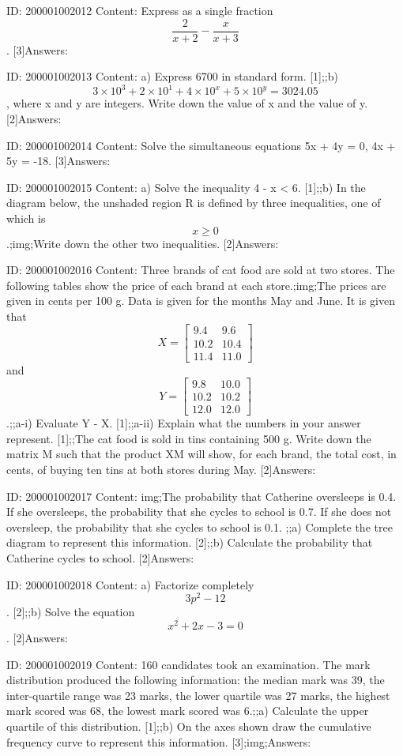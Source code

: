 \documentclass{article}
\begin{document}
ID: 200001002012
Content:
Express as a single fraction $$\frac{2}{x+2}-\frac{x}{x+3}$$. [3]Answers:

ID: 200001002013
Content:
a) Express 6700 in standard form. [1];;b) $$3 \times 10^{3} +2 \times 10^{1} +4 \times 10^{x}+5 \times 10^{y}=3024.05$$, where x and y are integers. Write down the value of x and the value of y. [2]Answers:

ID: 200001002014
Content:
Solve the simultaneous equations 5x + 4y = 0, 4x + 5y = -18. [3]Answers:

ID: 200001002015
Content:
a) Solve the inequality 4 - x < 6. [1];;b) In the diagram below, the unshaded region R is defined by three inequalities, one of which is $$x \geq 0$$.;img;Write down the other two inequalities. [2]Answers:

ID: 200001002016
Content:
Three brands of cat food are sold at two stores. The following tables show the price of each brand at each store.;img;The prices are given in cents per 100 g. Data is given for the months May and June. It is given that $$X=\begin{bmatrix}9.4&9.6\\10.2&10.4\\11.4&11.0\end{bmatrix}$$ and $$Y=\begin{bmatrix}9.8&10.0\\10.2&10.2\\12.0&12.0\end{bmatrix}$$.;;a-i) Evaluate Y - X. [1];;a-ii) Explain what the numbers in your answer represent. [1];;The cat food is sold in tins containing 500 g. Write down the matrix M such that the product XM will show, for each brand, the total cost, in cents, of buying ten tins at both stores during May. [2]Answers:

ID: 200001002017
Content:
img;The probability that Catherine oversleeps is 0.4. If she oversleeps, the probability that she cycles to school is 0.7. If she does not oversleep, the probability that she cycles to school is 0.1. ;;a) Complete the tree diagram to represent this information. [2];;b) Calculate the probability that Catherine cycles to school. [2]Answers:

ID: 200001002018
Content:
a) Factorize completely $$3p^{2} -12$$. [2];;b) Solve the equation $$x^{2} +2x-3=0$$. [2]Answers:

ID: 200001002019
Content:
160 candidates took an examination. The mark distribution produced the following information: the median mark was 39, the inter-quartile range was 23 marks, the lower quartile was 27 marks, the highest mark scored was 68, the lowest mark scored was 6.;;a) Calculate the upper quartile of this distribution. [1];;b) On the axes shown draw the cumulative frequency curve to represent this information. [3];img;Answers:
\end{document}
